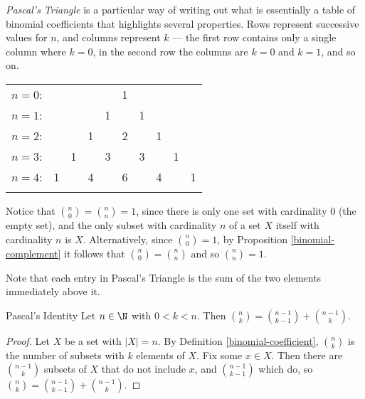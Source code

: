 \documentclass[12pt]{article}
\begin{document}
\begin{defn}\label{pascals-triangle}
    \emph{Pascal's Triangle} is a particular way of writing out what is essentially a table of binomial coefficients that highlights several properties. Rows represent successive values for $n$, and columns represent $k$ --- the first row contains only a single column where $k=0$, in the second row the columns are $k=0$ and $k=1$, and so on.
    \begin{center}
        \begin{tabular}{rccccccccc}
            $n=0$:&    &    &    &    &  1\\\noalign{\smallskip\smallskip}
            $n=1$:&    &    &    &  1 &    &  1\\\noalign{\smallskip\smallskip}
            $n=2$:&    &    &  1 &    &  2 &    &  1\\\noalign{\smallskip\smallskip}
            $n=3$:&    &  1 &    &  3 &    &  3 &    &  1\\\noalign{\smallskip\smallskip}
            $n=4$:&  1 &    &  4 &    &  6 &    &  4 &    &  1\\\noalign{\smallskip\smallskip}
        \end{tabular}
    \end{center}
\end{defn}

\begin{rmk}
    Notice that $\binom{n}{0} = \binom{n}{n} = 1$, since there is only one set with cardinality $0$ (the empty set), and the only subset with cardinality $n$ of a set $X$ itself with cardinality $n$ is $X$. Alternatively, since $\binom{n}{0} = 1$, by Proposition \ref{binomial-complement} it follows that $\binom{n}{0} = \binom{n}{n}$ and so $\binom{n}{n} = 1$.
\end{rmk}

\begin{rmk}
    Note that each entry in Pascal's Triangle is the sum of the two elements immediately above it.
\end{rmk}

\begin{prop}{Pascal's Identity}\label{pascals-identity}
    Let $n \in \N$ with $0 < k < n$. Then $\binom{n}{k} = \binom{n-1}{k-1} + \binom{n-1}{k}$.
\end{prop}

\begin{proof}
    Let $X$ be a set with $|X| = n$. By Definition \ref{binomial-coefficient}, $\binom{n}{k}$ is the number of subsets with $k$ elements of $X$. Fix some $x \in X$. Then there are $\binom{n-1}{k}$ subsets of $X$ that do not include $x$, and $\binom{n-1}{k-1}$ which do, so $\binom{n}{k} = \binom{n-1}{k-1} + \binom{n-1}{k}$.
\end{proof}
\end{document}
